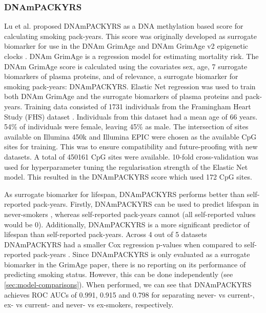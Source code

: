 \documentclass[draft]{article}
\begin{document}
\subsubsection{DNAmPACKYRS} \label{sec:dnampackyrs}
Lu et al. \cite{lu2019dna} proposed DNAmPACKYRS as a DNA methylation based score for calculating smoking pack-years. This score was originally developed as surrogate biomarker for use in the DNAm GrimAge \cite{lu2019dna} and DNAm GrimAge v2 epigenetic clocks \cite{lu2022dna}. DNAm GrimAge is a regression model for estimating mortality risk. The DNAm GrimAge score is calculated using the covariates sex, age, 7 surrogate biomarkers of plasma proteins, and of relevance, a surrogate biomarker for smoking pack-years: DNAmPACKYRS. Elastic Net regression was used to train both DNAm GrimAge and the surrogate biomarkers of plasma proteins and pack-years. Training data consisted of 1731 individuals from the Framingham Heart Study (FHS) dataset \cite{doi:10.2105/AJPH.41.3.279}. Individuals from this dataset had a mean age of 66 years. 54\% of individuals were female, leaving 45\% as male. The intersection of sites available on Illumina 450k and Illumina EPIC were chosen as the available CpG sites for training. This was to ensure compatibility and future-proofing with new datasets. A total of \num{450161} CpG sites were available. 10-fold cross-validation was used for hyperparameter tuning the regularisation strength of the Elastic Net model. This resulted in the DNAmPACKYRS score which used 172 CpG sites.

As surrogate biomarker for lifespan, DNAmPACKYRS performs better than self-reported pack-years. Firstly, DNAmPACKYRS can be used to predict lifespan in never-smokers \cite{lu2019dna}, whereas self-reported pack-years cannot (all self-reported values would be 0). Additionally, DNAmPACKYRS is a more significant predictor of lifespan than self-reported pack-years. Across 4 out of 5 datasets DNAmPACKYRS had a smaller Cox regression p-values when compared to self-reported pack-years \cite{lu2019dna}. Since DNAmPACKYRS is only evaluated as a surrogate biomarker in the GrimAge paper, there is no reporting on its performance of predicting smoking status. However, this can be done independently (see \ref{sec:model-comparisons}). When performed, we can see that DNAmPACKYRS achieves ROC AUCs of 0.991, 0.915 and 0.798 for separating never- vs current-, ex- vs current- and never- vs ex-smokers, respectively.
\end{document}
